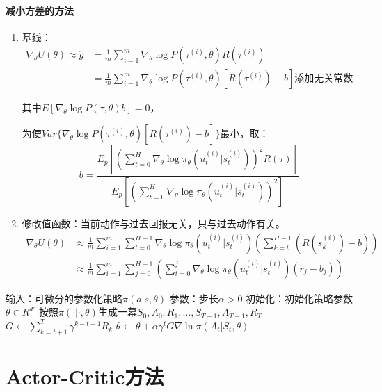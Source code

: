 \documentclass[
12pt, %
a4paper, 
oneside, %
headinclude,footinclude, %
]{scrartcl}
\begin{document}
\paragraph{减小方差的方法}
\begin{enumerate}
\item 基线：
\begin{align*}
\nabla_\theta U(\theta) \approx \hat{g} &= \frac{1}{m}\sum_{i = 1}^{m} \nabla_\theta \log P(\tau^{(i)}, \theta)R(\tau^{(i)}) \\
&= \frac{1}{m}\sum_{i = 1}^{m} \nabla_\theta \log P(\tau^{(i)}, \theta)[R(\tau^{(i)}) - b] \text{添加无关常数}
\end{align*}

其中$ E[\nabla_\theta\log P(\tau, \theta)b] = 0 $，

为使$ Var\{\nabla_\theta\log P(\tau^{(i)}, \theta)[R(\tau^{(i)}) - b]\} $最小，取：
$$ b = \frac{E_p[(\sum_{t = 0}^{H} \nabla_\theta\log\pi_\theta(u_t^{(i)}|s_t^{(i)}))^2 R(\tau)]}{E_p[(\sum_{t = 0}^{H} \nabla_\theta\log\pi_\theta(u_t^{(i)}|s_t^{(i)}))^2]} $$
\item 修改值函数：当前动作与过去回报无关，只与过去动作有关。
\begin{align*}
\nabla_\theta U(\theta) &\approx \frac{1}{m}\sum_{i = 1}^{m}\sum_{t = 0}^{H - 1}\nabla_\theta\log\pi_\theta(u_t^{(i)}|s_t^{(i)})(\sum_{k = t}^{H - 1}(R(s_k^{(i)}) - b)) \\
&\approx \frac{1}{m}\sum_{i = 1}^{m}\sum_{j = 0}^{H - 1}(\sum_{t = 0}^{j}\nabla_\theta\log\pi_\theta(u_t^{(i)}|s_t^{(i)})(r_j - b_j))
\end{align*}
\end{enumerate}
\begin{myalgorithm}[REINFORCE]
\State 输入：可微分的参数化策略$ \pi(a|s, \theta) $
\State 参数：步长$ \alpha > 0 $
\State 初始化：初始化策略参数$ \theta \in R^{d'} $
\Loop {}
\State 按照$ \pi(\cdot|\cdot, \theta) $生成一幕$ S_0, A_0, R_1, \ldots, S_{T - 1}, A_{T - 1}, R_T $
\State $ G \gets \sum_{k = t + 1}^{T} \gamma^{k - t - 1}R_k $ 
\State $ \theta \gets \theta + \alpha\gamma^t G \nabla \ln \pi(A_t|S_t, \theta) $
\EndFor
\EndLoop
\end{myalgorithm}
\section{Actor-Critic方法}
\end{document}
